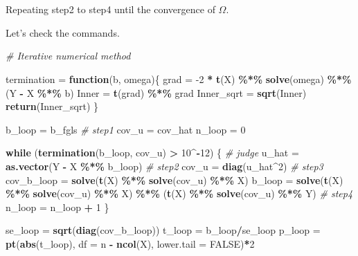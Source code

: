 \documentclass[
  12pt,
]{article}
\newenvironment{Shaded}{\begin{snugshade}}{\end{snugshade}}
\newcommand{\CommentTok}[1]{\textcolor[rgb]{0.56,0.35,0.01}{\textit{#1}}}
\newcommand{\ControlFlowTok}[1]{\textcolor[rgb]{0.13,0.29,0.53}{\textbf{#1}}}
\newcommand{\DataTypeTok}[1]{\textcolor[rgb]{0.13,0.29,0.53}{#1}}
\newcommand{\DecValTok}[1]{\textcolor[rgb]{0.00,0.00,0.81}{#1}}
\newcommand{\KeywordTok}[1]{\textcolor[rgb]{0.13,0.29,0.53}{\textbf{#1}}}
\newcommand{\NormalTok}[1]{#1}
\newcommand{\OperatorTok}[1]{\textcolor[rgb]{0.81,0.36,0.00}{\textbf{#1}}}
\newcommand{\OtherTok}[1]{\textcolor[rgb]{0.56,0.35,0.01}{#1}}
\newcommand{\StringTok}[1]{\textcolor[rgb]{0.31,0.60,0.02}{#1}}
\begin{document}
Repeating step2 to step4 until the convergence of \(\hat{\Omega}\).

Let's check the commands.

\begin{Shaded}
\begin{Highlighting}[]
\CommentTok{\# Iterative numerical method}

\NormalTok{termination =}\StringTok{ }\ControlFlowTok{function}\NormalTok{(b, omega)\{}
\NormalTok{    grad =}\StringTok{ }\DecValTok{{-}2} \OperatorTok{*}\StringTok{ }\KeywordTok{t}\NormalTok{(X) }\OperatorTok{\%*\%}\StringTok{ }\KeywordTok{solve}\NormalTok{(omega) }\OperatorTok{\%*\%}\StringTok{ }\NormalTok{(Y }\OperatorTok{{-}}\StringTok{ }\NormalTok{X }\OperatorTok{\%*\%}\StringTok{ }\NormalTok{b)}
\NormalTok{    Inner =}\StringTok{ }\KeywordTok{t}\NormalTok{(grad) }\OperatorTok{\%*\%}\StringTok{ }\NormalTok{grad}
\NormalTok{    Inner\_sqrt =}\StringTok{ }\KeywordTok{sqrt}\NormalTok{(Inner)}
    \KeywordTok{return}\NormalTok{(Inner\_sqrt)}
\NormalTok{\}}

\NormalTok{b\_loop =}\StringTok{ }\NormalTok{b\_fgls }\CommentTok{\# step1}
\NormalTok{cov\_u =}\StringTok{ }\NormalTok{cov\_hat}
\NormalTok{n\_loop =}\StringTok{ }\DecValTok{0}

\ControlFlowTok{while}\NormalTok{ (}\KeywordTok{termination}\NormalTok{(b\_loop, cov\_u) }\OperatorTok{\textgreater{}}\StringTok{ }\DecValTok{10}\OperatorTok{\^{}{-}}\DecValTok{12}\NormalTok{) \{ }\CommentTok{\# judge}
\NormalTok{    u\_hat =}\StringTok{ }\KeywordTok{as.vector}\NormalTok{(Y }\OperatorTok{{-}}\StringTok{ }\NormalTok{X }\OperatorTok{\%*\%}\StringTok{ }\NormalTok{b\_loop) }\CommentTok{\# step2}
\NormalTok{    cov\_u =}\StringTok{ }\KeywordTok{diag}\NormalTok{(u\_hat}\OperatorTok{\^{}}\DecValTok{2}\NormalTok{)   }\CommentTok{\# step3}
\NormalTok{    cov\_b\_loop =}\StringTok{ }\KeywordTok{solve}\NormalTok{(}\KeywordTok{t}\NormalTok{(X) }\OperatorTok{\%*\%}\StringTok{ }\KeywordTok{solve}\NormalTok{(cov\_u) }\OperatorTok{\%*\%}\StringTok{ }\NormalTok{X)}
\NormalTok{    b\_loop =}\StringTok{  }\KeywordTok{solve}\NormalTok{(}\KeywordTok{t}\NormalTok{(X) }\OperatorTok{\%*\%}\StringTok{ }\KeywordTok{solve}\NormalTok{(cov\_u) }\OperatorTok{\%*\%}\StringTok{ }\NormalTok{X) }\OperatorTok{\%*\%}\StringTok{ }
\StringTok{        }\NormalTok{(}\KeywordTok{t}\NormalTok{(X) }\OperatorTok{\%*\%}\StringTok{ }\KeywordTok{solve}\NormalTok{(cov\_u) }\OperatorTok{\%*\%}\StringTok{ }\NormalTok{Y) }\CommentTok{\# step4}
\NormalTok{    n\_loop =}\StringTok{ }\NormalTok{n\_loop }\OperatorTok{+}\StringTok{ }\DecValTok{1}
\NormalTok{\}}


\NormalTok{se\_loop =}\StringTok{ }\KeywordTok{sqrt}\NormalTok{(}\KeywordTok{diag}\NormalTok{(cov\_b\_loop))}
\NormalTok{t\_loop =}\StringTok{ }\NormalTok{b\_loop}\OperatorTok{/}\NormalTok{se\_loop}
\NormalTok{p\_loop =}\StringTok{ }\KeywordTok{pt}\NormalTok{(}\KeywordTok{abs}\NormalTok{(t\_loop), }\DataTypeTok{df =}\NormalTok{ n }\OperatorTok{{-}}\StringTok{ }\KeywordTok{ncol}\NormalTok{(X), }\DataTypeTok{lower.tail =} \OtherTok{FALSE}\NormalTok{)}\OperatorTok{*}\DecValTok{2}
\end{Highlighting}
\end{Shaded}
\end{document}
